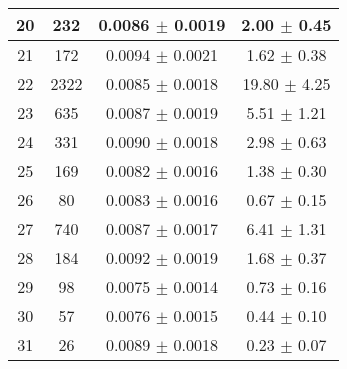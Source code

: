 \begin{table}
\begin{tabular}{c|c|c|c}
20 & 232  & 0.0086  $\pm$  0.0019  & 2.00 $\pm$ 0.45   \\\hline
21 & 172  & 0.0094  $\pm$  0.0021  & 1.62 $\pm$ 0.38   \\\hline
22 & 2322  & 0.0085  $\pm$  0.0018  & 19.80 $\pm$ 4.25   \\\hline
23 & 635  & 0.0087  $\pm$  0.0019  & 5.51 $\pm$ 1.21   \\\hline
24 & 331  & 0.0090  $\pm$  0.0018  & 2.98 $\pm$ 0.63   \\\hline
25 & 169  & 0.0082  $\pm$  0.0016  & 1.38 $\pm$ 0.30   \\\hline
26 & 80  & 0.0083  $\pm$  0.0016  & 0.67 $\pm$ 0.15   \\\hline
27 & 740  & 0.0087  $\pm$  0.0017  & 6.41 $\pm$ 1.31   \\\hline
28 & 184  & 0.0092  $\pm$  0.0019  & 1.68 $\pm$ 0.37   \\\hline
29 & 98  & 0.0075  $\pm$  0.0014  & 0.73 $\pm$ 0.16   \\\hline
30 & 57  & 0.0076  $\pm$  0.0015  & 0.44 $\pm$ 0.10   \\\hline
31 & 26  & 0.0089  $\pm$  0.0018  & 0.23 $\pm$ 0.07   \\\hline
\end{tabular}
\end{table}

